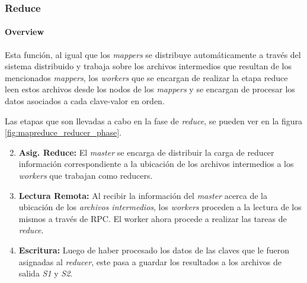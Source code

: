 \subsubsection{Reduce}
\label{sssec:reduce}

\paragraph{Overview} Esta función, al igual que los {\it mappers} se distribuye
automáticamente a través del sistema distribuido y trabaja sobre los archivos
intermedios que resultan de los mencionados {\it mappers}, los {\it workers}
que se encargan de realizar la etapa {reduce} leen estos archivos desde los
nodos de los {\it mappers} y se encargan de procesar los datos asociados a cada
clave-valor en orden.

Las etapas que son llevadas a cabo en la fase de {\it reduce}, se pueden ver en
la figura \ref{fig:mapreduce_reducer_phase}.


\begin{enumerate}
\setcounter{enumi}{1}
\item {\bf Asig. Reduce:} El {\it master} se encarga de distribuir la carga de
      reducer información correspondiente a la ubicación de los archivos 
      intermedios a los {\it workers} que trabajan como reducers.
\setcounter{enumi}{4}
\item {\bf Lectura Remota:} Al recibir la información del {\it master} acerca
      de la ubicación de los {\it archivos intermedios}, los {\it workers}
      proceden a la lectura de los mismos a través de RPC. El worker ahora
      procede a realizar las tareas de {\it reduce}.
\item {\bf Escritura:} Luego de haber procesado los datos de las claves que le
      fueron asignadas al {\it reducer}, este pasa a guardar los resultados a
      los archivos de salida {\it S1} y {\it S2}.
\end{enumerate}


